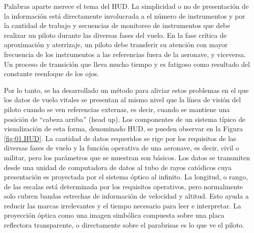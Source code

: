
Palabras aparte merece el tema del \ac{HUD}.
La simplicidad o no de presentaci\'on de la informaci\'on est\'a directamente involucrada a el número de instrumentos  y por la cantidad de trabajo y secuencias de monitoreo de instrumentos que debe realizar un piloto durante las diversas fases del vuelo. En la fase crítica de aproximación y aterrizaje, un piloto debe transferir su atención con mayor frecuencia de los instrumentos a las referencias fuera de la aeronave, y viceversa. Un proceso de transición que lleva mucho tiempo y es fatigoso como resultado del constante reenfoque de los ojos.

Por lo tanto, se ha desarrollado un método para aliviar estos problemas en el que los datos de vuelo vitales se presentan al mismo nivel que la línea de visión del piloto cuando se ven referencias externas, es decir, cuando se mantiene una posición de ``cabeza arriba'' (head up). Los componentes de un sistema típico de visualización de esta forma, denominado \ac{HUD}, se pueden observar en la Figura \ref{fig:01.HUD}. 
La cantidad de datos requeridos se rige por los requisitos de las diversas fases de vuelo y la función operativa de una aeronave, es decir, civil o militar, pero los  parámetros que se muestran son básicos. Los datos se transmiten desde una unidad de computadora de datos al tubo de rayos catódicos  cuya presentación es proyectada por el sistema óptico al infinito. La longitud, o rango, de las escalas está determinada por los requisitos operativos, pero normalmente solo cubren bandas estrechas de información de velocidad y altitud. Esto ayuda a reducir las marcas irrelevantes y el tiempo necesario para leer e interpretar. La  proyecci\'on óptica como una imagen simbólica compuesta sobre una placa reflectora transparente, o directamente sobre el parabrisas es lo que ve el piloto. %

